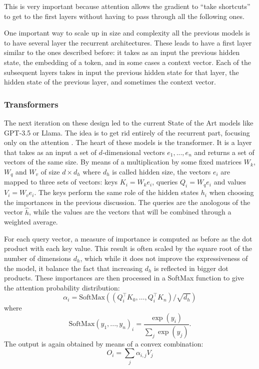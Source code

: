 \documentclass[]{marticle}
\begin{document}
This is very important because attention allows the gradient to ``take shortcuts'' to get to the first
layers without having to pass through all the following ones.

One important way to scale up in size and complexity all the previous models is to have several
layer the recurrent architectures. These leads to have a first layer similar to the ones described
before: it takes as an input the previous hidden state, the embedding of a token, and in some cases
a context vector. Each of the subsequent layers takes in input the previous hidden state for that
layer, the hidden state of the previous layer, and sometimes the context vector.

\subsubsection{Transformers}

The next iteration on these design led to the current State of the Art models like GPT-3.5 or Llama.
The idea is to get rid entirely of the recurrent part, focusing only on the attention
\cite{attention-all-need}. The heart of these models is the transformer. It is a layer that takes as
an input a set of $d$-dimensional vectors $e_1,..., e_n$ and returns a set of vectors of the same
size. By means of a multiplication by some fixed matrices $W_k$, $W_q$ and $W_v$ of size $d\times
d_h$ where $d_h$ is called hidden size, the vectors $e_i$ are mapped to three sets of vectors: keys
$K_i = W_k e_i$, queries $Q_i = W_q e_i$ and values $V_i = W_v e_i$. The keys perform the same role
of the hidden states $h_i$ when choosing the importances in the previous discussion. The queries are
the anologous of the vector $\hat{h}$, while the values are the vectors that will be combined
through a weighted average.

For each query vector, a measure of importance is computed as before as the dot product with each
key value. This result is often scaled by the square root of the number of dimensions $d_h$, which
while it does not improve the expressiveness of the model, it balance the fact that increasing $d_h$
is reflected in bigger dot products. These importances are then processed in a SoftMax function to
give the attention probability distribution:
$$ \alpha_i = \text{SoftMax}((Q_i^\top K_0, \dots, Q_i^\top K_n) / \sqrt{d_h}) $$
where 
$$ \text{SoftMax}(y_1,...,y_n)_i = \frac{\exp(y_i)}{\sum_j \exp (y_j)}. $$
The output is again obtained by means of a convex combination:
$$ O_i = \sum_j \alpha_{i,j} V_j $$
\end{document}
